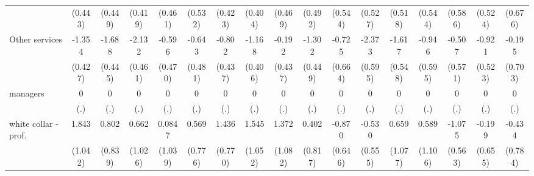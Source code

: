 {\begin{tabular}{l*{16}{c}}
                    &     (0.443)         &     (0.449)         &     (0.419)         &     (0.461)         &     (0.532)         &     (0.423)         &     (0.404)         &     (0.469)         &     (0.492)         &     (0.544)         &     (0.527)         &     (0.518)         &     (0.544)         &     (0.586)         &     (0.524)         &     (0.676)         \\
[1em]
Other services      &      -1.354\sym{**} &      -1.688\sym{***}&      -2.132\sym{***}&      -0.596         &      -0.643         &      -0.802         &      -1.168\sym{**} &      -0.192         &      -1.302\sym{**} &      -0.725         &      -2.373\sym{***}&      -1.617\sym{**} &      -0.946         &      -0.507         &      -0.921         &      -0.195         \\
                    &     (0.427)         &     (0.445)         &     (0.461)         &     (0.470)         &     (0.481)         &     (0.437)         &     (0.406)         &     (0.437)         &     (0.449)         &     (0.664)         &     (0.595)         &     (0.548)         &     (0.595)         &     (0.571)         &     (0.523)         &     (0.703)         \\
[1em]
managers            &           0         &           0         &           0         &           0         &           0         &           0         &           0         &           0         &           0         &           0         &           0         &           0         &           0         &           0         &           0         &           0         \\
                    &         (.)         &         (.)         &         (.)         &         (.)         &         (.)         &         (.)         &         (.)         &         (.)         &         (.)         &         (.)         &         (.)         &         (.)         &         (.)         &         (.)         &         (.)         &         (.)         \\
[1em]
white collar - prof.&       1.843         &       0.802         &       0.662         &      0.0847         &       0.569         &       1.436         &       1.545         &       1.372         &       0.402         &      -0.870         &      -0.530         &       0.659         &       0.589         &      -1.075         &      -0.199         &      -0.434         \\
                    &     (1.042)         &     (0.839)         &     (1.026)         &     (1.039)         &     (0.776)         &     (0.770)         &     (1.052)         &     (1.082)         &     (0.817)         &     (0.646)         &     (0.555)         &     (1.077)         &     (1.106)         &     (0.563)         &     (0.655)         &     (0.784)         \\

\end{tabular}}
